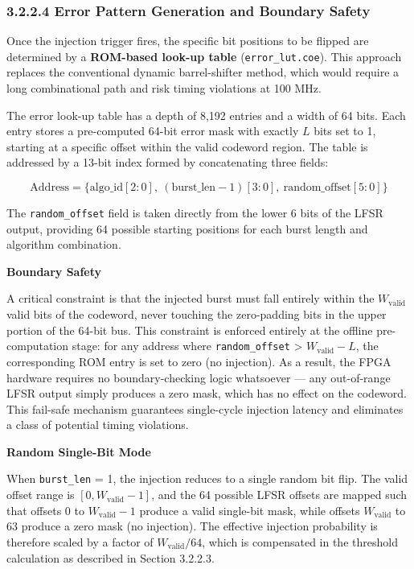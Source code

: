 \documentclass[
  english,
  12pt,
]{report}
\begin{document}
\subsubsection{3.2.2.4 Error Pattern Generation and Boundary
Safety}\label{error-pattern-generation-and-boundary-safety}

Once the injection trigger fires, the specific bit positions to be
flipped are determined by a \textbf{ROM-based look-up table}
(\texttt{error\_lut.coe}). This approach replaces the conventional
dynamic barrel-shifter method, which would require a long combinational
path and risk timing violations at 100 MHz.

The error look-up table has a depth of 8,192 entries and a width of 64
bits. Each entry stores a pre-computed 64-bit error mask with exactly
\(L\) bits set to 1, starting at a specific offset within the valid
codeword region. The table is addressed by a 13-bit index formed by
concatenating three fields:

\[\text{Address} = \{ \text{algo\_id}[2:0],\ (\text{burst\_len} - 1)[3:0],\ \text{random\_offset}[5:0] \}\]

The \texttt{random\_offset} field is taken directly from the lower 6
bits of the LFSR output, providing 64 possible starting positions for
each burst length and algorithm combination.

\textbf{Boundary Safety}

A critical constraint is that the injected burst must fall entirely
within the \(W_{\text{valid}}\) valid bits of the codeword, never
touching the zero-padding bits in the upper portion of the 64-bit bus.
This constraint is enforced entirely at the offline pre-computation
stage: for any address where \texttt{random\_offset} \textgreater{}
\(W_{\text{valid}} - L\), the corresponding ROM entry is set to zero (no
injection). As a result, the FPGA hardware requires no boundary-checking
logic whatsoever --- any out-of-range LFSR output simply produces a zero
mask, which has no effect on the codeword. This fail-safe mechanism
guarantees single-cycle injection latency and eliminates a class of
potential timing violations.

\textbf{Random Single-Bit Mode}

When \texttt{burst\_len} = 1, the injection reduces to a single random
bit flip. The valid offset range is \([0, W_{\text{valid}} - 1]\), and
the 64 possible LFSR offsets are mapped such that offsets 0 to
\(W_{\text{valid}} - 1\) produce a valid single-bit mask, while offsets
\(W_{\text{valid}}\) to 63 produce a zero mask (no injection). The
effective injection probability is therefore scaled by a factor of
\(W_{\text{valid}} / 64\), which is compensated in the threshold
calculation as described in Section 3.2.2.3.
\end{document}
